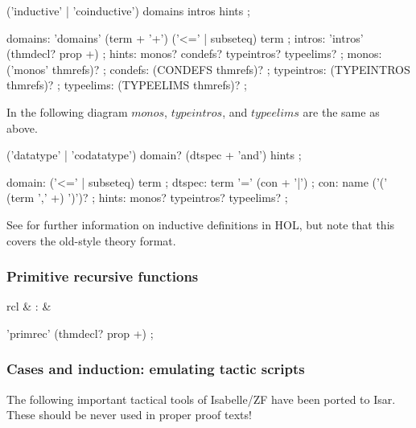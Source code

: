


\begin{rail}
  ('inductive' | 'coinductive') domains intros hints
  ;

  domains: 'domains' (term + '+') ('<=' | subseteq) term
  ;
  intros: 'intros' (thmdecl? prop +)
  ;
  hints: monos? condefs? typeintros? typeelims?
  ;
  monos: ('monos' thmrefs)?
  ;
  condefs: (CONDEFS thmrefs)?
  ;
  typeintros: (TYPEINTROS thmrefs)?
  ;
  typeelims: (TYPEELIMS thmrefs)?
  ;
\end{rail}

In the following diagram $monos$, $typeintros$, and $typeelims$ are the same
as above.

\begin{rail}
  ('datatype' | 'codatatype') domain? (dtspec + 'and') hints
  ;

  domain: ('<=' | subseteq) term
  ;
  dtspec: term '=' (con + '|')
  ;
  con: name ('(' (term ',' +) ')')?  
  ;
  hints: monos? typeintros? typeelims?
  ;
\end{rail}

See \cite{isabelle-ZF} for further information on inductive definitions in
HOL, but note that this covers the old-style theory format.


\subsubsection{Primitive recursive functions}

\begin{matharray}{rcl}
   & : &  \\
\end{matharray}

\begin{rail}
  'primrec' (thmdecl? prop +)
  ;
\end{rail}


\subsubsection{Cases and induction: emulating tactic scripts}

The following important tactical tools of Isabelle/ZF have been ported to
Isar.  These should be never used in proper proof texts!

